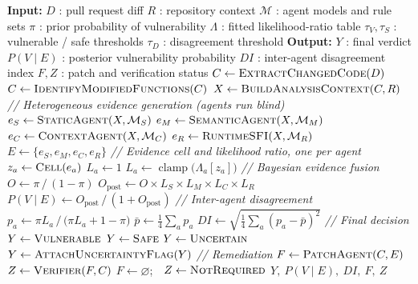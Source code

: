 \documentclass[conference,10pt]{IEEEtran}
\newcommand{\LRr}{\Lambda}
\newcommand{\clampop}{\operatorname{clamp}}
\begin{document}
\begin{algorithm}[H]
\caption{Bayesian Multi-Agent Vulnerability Detection}
\label{alg:main}
\small
\begin{algorithmic}[1]
\Statex \textbf{Input:}
\Statex \quad $D$ : pull request diff
\Statex \quad $R$ : repository context
\Statex \quad $\mathcal{M}$ : agent models and rule sets
\Statex \quad $\pi$ : prior probability of vulnerability
\Statex \quad $\LRr$ : fitted likelihood-ratio table
\Statex \quad $\tau_V,\tau_S$ : vulnerable / safe thresholds
\Statex \quad $\tau_D$ : disagreement threshold
\Statex \textbf{Output:}
\Statex \quad $Y$ : final verdict
\Statex \quad $P(V\mid E)$ : posterior vulnerability probability
\Statex \quad $DI$ : inter-agent disagreement index
\Statex \quad $F,Z$ : patch and verification status
\Statex
\State $C \gets \textsc{ExtractChangedCode}(D)$
\State $C \gets \textsc{IdentifyModifiedFunctions}(C)$
\State $X \gets \textsc{BuildAnalysisContext}(C,R)$
\Statex
\Statex \textit{// Heterogeneous evidence generation (agents run blind)}
\State $e_S \gets \textsc{StaticAgent}(X,\mathcal{M}_S)$
\State $e_M \gets \textsc{SemanticAgent}(X,\mathcal{M}_M)$
\State $e_C \gets \textsc{ContextAgent}(X,\mathcal{M}_C)$
\State $e_R \gets \textsc{RuntimeSFI}(X,\mathcal{M}_R)$
\State $E \gets \{e_S,e_M,e_C,e_R\}$
\Statex
\Statex \textit{// Evidence cell and likelihood ratio, one per agent}
  \State $z_a \gets \textsc{Cell}(e_a)$ 
    \State $L_a \gets 1$ 
  \Else
    \State $L_a \gets \clampop\bigl(\LRr_a[z_a]\bigr)$ 
  \EndIf
\EndFor
\Statex
\Statex \textit{// Bayesian evidence fusion}
\State $O \gets \pi \,/\, (1-\pi)$
\State $O_{\mathrm{post}} \gets O \times L_S \times L_M \times L_C \times L_R$
\State $P(V\mid E) \gets O_{\mathrm{post}} \,/\, (1+O_{\mathrm{post}})$
\Statex
\Statex \textit{// Inter-agent disagreement}
  \State $p_a \gets \pi L_a \,/\,\bigl(\pi L_a + 1 - \pi\bigr)$ 
\EndFor
\State $\bar{p} \gets \tfrac{1}{4}\sum_a p_a$
\State $DI \gets \sqrt{\tfrac{1}{4}\sum_a (p_a-\bar{p})^2}$
\Statex
\Statex \textit{// Final decision}
  \State $Y \gets \textsc{Vulnerable}$
  \State $Y \gets \textsc{Safe}$
\Else
  \State $Y \gets \textsc{Uncertain}$
\EndIf
{}
  \State $Y \gets \textsc{AttachUncertaintyFlag}(Y)$
\EndIf
\Statex
\Statex \textit{// Remediation}
  \State $F \gets \textsc{PatchAgent}(C,E)$
  \State $Z \gets \textsc{Verifier}(F,C)$
\Else
  \State $F \gets \varnothing$;\ \ $Z \gets \textsc{NotRequired}$
\EndIf
\Statex
\State \Return $Y,\ P(V\mid E),\ DI,\ F,\ Z$
\end{algorithmic}
\end{algorithm}
\end{document}
